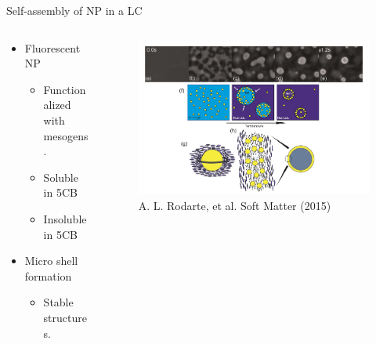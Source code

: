 \documentclass{beamer}
\begin{document}
\begin{frame}{Self-assembly of NP in a LC}
    \begin{columns}
        \begin{column}{0.4\textwidth}
            \begin{itemize}
        \item Fluorescent NP
        \begin{itemize}
            \item Functionalized with mesogens.
            \item Soluble in 5CB
            \item Insoluble in 5CB
        \end{itemize}
        \item Micro shell formation
        \begin{itemize}
            \item Stable structures.
        \end{itemize}
    \end{itemize}
        
        \end{column}

        \begin{column}{0.6\textwidth}
            \begin{figure}
                \centering
                \includegraphics[scale = 0.28]{Figures/Linda_Experiment.png}
                \caption{A. L. Rodarte, et al. Soft  Matter (2015)}
                \label{fig:enter-label}
            \end{figure}
        \end{column}
        \end{columns}
\end{frame}
\end{document}
